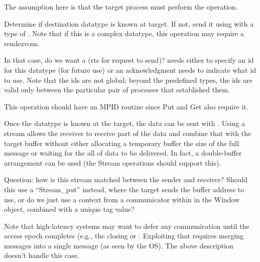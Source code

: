 \documentclass{article}
\begin{document}
\begin{tcp}
The assumption here is that the target process must perform the operation.

Determine if destination datatype is known at target.  If not, send it using
 with a type of .  Note
that if this is a complex datatype, this operation may require a rendezvous.

In that case, do we want a  (rts for
request to send)?  
 needs either to specify an id for this
datatype (for future use) or an acknowledgment needs to indicate what id to
use.  Note that the ids are not global; beyond the predefined types, the ids
are valid only between the particular pair of processes that established them.

This operation should have an MPID routine since Put and Get also require it. 

Once the datatype is known at the target, the data can be sent with
.  Using a stream allows the receiver to receive
part of the data and combine that with the target buffer without either
allocating a temporary buffer the size of the full message or waiting for the
all of data to be delivered.  In fact, a double-buffer arrangement can be used
(the Stream operations should support this).  

Question: how is this stream matched between the sender and receiver?  Should
this use a ``Stream_put'' instead, where the target sends the buffer address
to use, or do we just use a context from a communicator within in the Window
object, combined with a unique tag value?

Note that high-latency systems may want to defer any communication until the
access epoch completes (e.g., the closing  or
.  Exploiting that requires merging messages into a
single message (as seen by the OS).  The above description doesn't handle this
case. 
\end{tcp}
\end{document}
